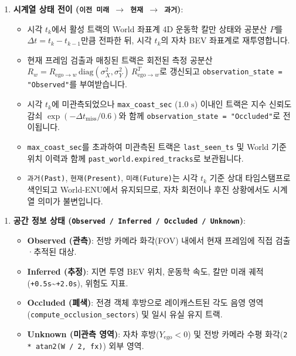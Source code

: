 \documentclass[10.5pt,a4paper]{article}
\begin{document}
\begin{enumerate}[leftmargin=1.8em,itemsep=2pt]
\item \textbf{시계열 상태 전이 (\texttt{이전 미래 $\rightarrow$ 현재 $\rightarrow$ 과거})}:
\begin{itemize}[leftmargin=1.5em,itemsep=2pt]
\item 시각 $t_k$에서 활성 트랙의 World 좌표계 4D 운동학 칼만 상태와 공분산 $P$를 $\Delta t = t_k - t_{k-1}$만큼 전파한 뒤, 시각 $t_k$의 자차 BEV 좌표계로 재투영합니다.
\item 현재 프레임 검출과 매칭된 트랙은 회전된 측정 공분산 $R_w = R_{\text{ego}\to w} \, \text{diag}(\sigma_X^2, \sigma_Y^2) \, R_{\text{ego}\to w}^T$로 갱신되고 \texttt{observation\_\allowbreak{}state = "Observed"}를 부여받습니다.
\item 시각 $t_k$에 미관측되었으나 \texttt{max\_\allowbreak{}coast\_\allowbreak{}sec} ($1.0\text{ s}$) 이내인 트랙은 지수 신뢰도 감쇠 $\exp(-\Delta t_{\text{miss}} / 0.6)$와 함께 \texttt{observation\_\allowbreak{}state = "Occluded"}로 전이됩니다.
\item \texttt{max\_\allowbreak{}coast\_\allowbreak{}sec}를 초과하여 미관측된 트랙은 \texttt{last\_\allowbreak{}seen\_\allowbreak{}ts} 및 World 기준 위치 이력과 함께 \texttt{past\_\allowbreak{}world.\allowbreak{}expired\_\allowbreak{}tracks}로 보관됩니다.
\item \texttt{과거(Past)}, \texttt{현재(Present)}, \texttt{미래(Future)}는 시각 $t_k$ 기준 상대 타임스탬프로 색인되고 World-ENU에서 유지되므로, 자차 회전이나 후진 상황에서도 시계열 의미가 불변입니다.
\end{itemize}
\end{enumerate}

\begin{enumerate}[leftmargin=1.8em,itemsep=2pt]
\item \textbf{공간 정보 상태 (\texttt{Observed /\allowbreak{} Inferred /\allowbreak{} Occluded /\allowbreak{} Unknown})}:
\begin{itemize}[leftmargin=1.5em,itemsep=2pt]
\item \textbf{Observed (관측)}: 전방 카메라 화각(FOV) 내에서 현재 프레임에 직접 검출·추적된 대상.
\item \textbf{Inferred (추정)}: 지면 투영 BEV 위치, 운동학 속도, 칼만 미래 궤적(\texttt{+0.\allowbreak{}5s}\textasciitilde{}\texttt{+2.\allowbreak{}0s}), 위험도 지표.
\item \textbf{Occluded (폐색)}: 전경 객체 후방으로 레이캐스트된 각도 음영 영역(\texttt{compute\_\allowbreak{}occlusion\_\allowbreak{}sectors}) 및 일시 유실 유지 트랙.
\item \textbf{Unknown (미관측 영역)}: 자차 후방($Y_{\text{ego}} < 0$) 및 전방 카메라 수평 화각(\texttt{2 * atan2(W /\allowbreak{} 2,\allowbreak{} fx)}) 외부 영역.
\end{itemize}
\end{enumerate}
\end{document}
